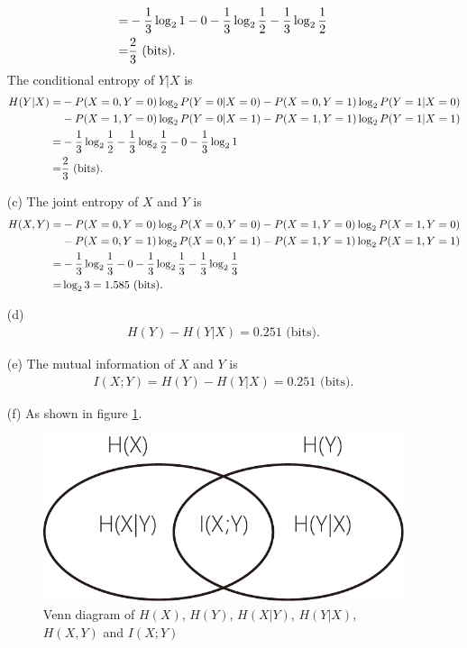 \documentclass{assignment}
\begin{document}
\begin{sol}
\begin{itemize}
\begin{align}
            \notag=&-\frac{1}{3}\log_21-0-\frac{1}{3}\log_2\frac{1}{2}-\frac{1}{3}\log_2\frac{1}{2}\\
            =&\frac{2}{3}\text{ (bits)}.
        \end{align}
        The conditional entropy of $Y\vert X$ is
        \begin{align}
            \notag H(Y\vert X)=&-P(X=0,Y=0)\log_2P(Y=0\vert X=0)-P(X=0,Y=1)\log_2P(Y=1\vert X=0)\\
            \notag&-P(X=1,Y=0)\log_2P(Y=0\vert X=1)-P(X=1,Y=1)\log_2P(Y=1\vert X=1)\\
            \notag=&-\frac{1}{3}\log_2\frac{1}{2}-\frac{1}{3}\log_2\frac{1}{2}-0-\frac{1}{3}\log_21\\
            =&\frac{2}{3}\text{ (bits)}.
        \end{align}
        \item[(c)] The joint entropy of $X$ and $Y$ is
        \begin{align}
            \notag H(X,Y)=&-P(X=0,Y=0)\log_2P(X=0,Y=0)-P(X=1,Y=0)\log_2P(X=1,Y=0)\\
            \notag&-P(X=0,Y=1)\log_2P(X=0,Y=1)-P(X=1,Y=1)\log_2P(X=1,Y=1)\\
            \notag=&-\frac{1}{3}\log_2\frac{1}{3}-0-\frac{1}{3}\log_2\frac{1}{3}-\frac{1}{3}\log_2\frac{1}{3}\\
            =&\log_23=1.585\text{ (bits)}.
        \end{align}
        \item[(d)] 
        \begin{align}
            H(Y)-H(Y\vert X)=0.251\text{ (bits)}.
        \end{align}
        \item[(e)] The mutual information of $X$ and $Y$ is
        \begin{align}
            I(X;Y)=H(Y)-H(Y\vert X)=0.251\text{ (bits)}.
        \end{align}
        \item[(f)] As shown in figure \ref{A-7-P-6}.
        \begin{figure}[h]
            \centering
            \includegraphics[width=.4\columnwidth]{A-7-P-6.pdf}
            \caption{Venn diagram of $H(X)$, $H(Y)$, $H(X\vert Y)$, $H(Y\vert X)$, $H(X,Y)$ and $I(X;Y)$}
            \label{A-7-P-6}
        \end{figure}
    \end{itemize}
\end{sol}
\end{document}
